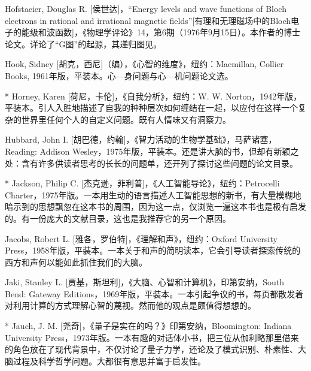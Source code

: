 \begin{thebib}
\begin{biblist}
\item Hofstacier, Douglas R. [侯世达]，“Energy levels and wave functions of Bloch electrons in rational and irrational magnetic fields”[有理和无理磁场中的Bloch电子的能级和波函数]，《物理学评论》14，第6期（1976年9月15日）。本作者的博士论文。详论了“G图”的起源，其递归图见。

\item Hook, Sidney [胡克，西尼]（编），《心智的维度》，纽约：Macmillan, Collier Books, 1961年版，平装本。心—身问题与心—机问题论文选。

\item[*] Horney, Karen [荷尼，卡伦]，《自我分析》，纽约：W. W. Norton，1942年版，平装本。引人入胜地描述了自我的种种层次如何缠结在一起，以应付在这样一个复杂的世界里任何个人的自定义问题。既有人情味又有洞察力。

\item Hubbard, John I. [胡巴德，约翰]，《智力活动的生物学基础》，马萨诸塞，Reading: Addison Wesley，1975年版，平装本。还是讲大脑的书，但却有新颖之处：含有许多供读者思考的长长的问题单，还开列了探讨这些问题的论文目录。

\item[*] Jackson, Philip C. [杰克逊，菲利普]，《人工智能导论》，纽约：Petrocelli Charter，1975年版。一本用生动的语言描述人工智能思想的新书，有大量模糊地暗示到的思想飘忽在这本书的周围，因为这一点，仅浏览一遍这本书也是极有启发的。有一份庞大的文献目录，这也是我推荐它的另一个原因。

\item Jacobs, Robert L. [雅各，罗伯特]，《理解和声》，纽约：Oxford University Press，1958年版，平装本。一本关于和声的简明读本，它会引导读者探索传统的西方和声何以能如此抓住我们的大脑。

\item Jaki, Stanley L. [贾基，斯坦利]，《大脑、心智和计算机》，印第安纳，South Bend: Gateway Editions，1969年版，平装本。一本引起争议的书，每页都散发着对利用计算的方式理解心智的蔑视。然而他的观点是颇值得想想的。

\item[*] Jauch, J. M. [尧奇]，《量子是实在的吗？》印第安纳，Bloomington: Indiana University Press，1973年版。一本有趣的对话体小书，把三位从伽利略那里借来的角色放在了现代背景中，不仅讨论了量子力学，还论及了模式识别、朴素性、大脑过程及科学哲学问题。大都很有意思并富于启发性。


\end{biblist}
\end{thebib}
